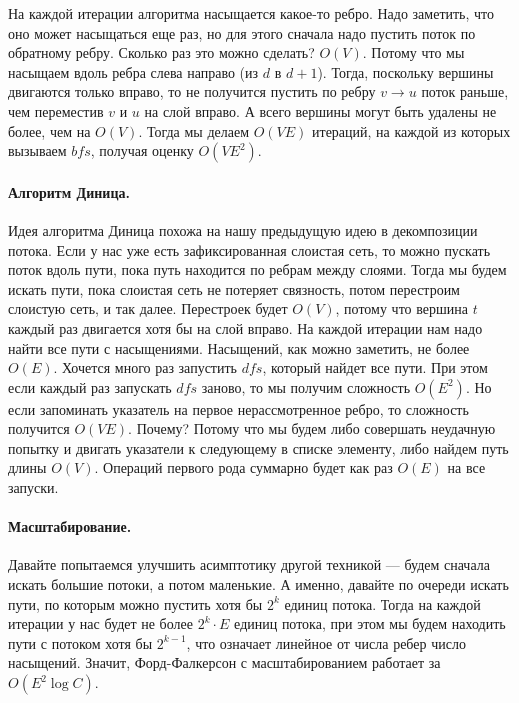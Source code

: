 \documentclass[12pt]{article}
\begin{document}
На каждой итерации алгоритма насыщается какое-то ребро. Надо заметить, что оно может насыщаться еще раз, но для этого сначала надо пустить поток по обратному ребру. Сколько раз это можно сделать? $O(V)$. Потому что мы насыщаем вдоль ребра слева направо (из $d$ в $d + 1$). Тогда, поскольку вершины двигаются только вправо, то не получится пустить по ребру $v \rightarrow u$ поток раньше, чем переместив $v$ и $u$ на слой вправо. А всего вершины могут быть удалены не более, чем на $O(V)$. Тогда мы делаем $O(VE)$ итераций, на каждой из которых вызываем $bfs$, получая оценку $O(VE^2)$.

\paragraph{Алгоритм Диница.} Идея алгоритма Диница похожа на нашу предыдущую идею в декомпозиции потока. Если у нас уже есть зафиксированная слоистая сеть, то можно пускать поток вдоль пути, пока путь находится по ребрам между слоями. Тогда мы будем искать пути, пока слоистая сеть не потеряет связность, потом перестроим слоистую сеть, и так далее. Перестроек будет $O(V)$, потому что вершина $t$ каждый раз двигается хотя бы на слой вправо. На каждой итерации нам надо найти все пути с насыщениями. Насыщений, как можно заметить, не более $O(E)$. Хочется много раз запустить $dfs$, который найдет все пути. При этом если каждый раз запускать $dfs$ заново, то мы получим сложность $O(E^2)$. Но если запоминать указатель на первое нерассмотренное ребро, то сложность получится $O(VE)$. Почему? Потому что мы будем либо совершать неудачную попытку и двигать указатели к следующему в списке элементу, либо найдем путь длины $O(V)$. Операций первого рода суммарно будет как раз $O(E)$ на все запуски.

\paragraph{Масштабирование.} Давайте попытаемся улучшить асимптотику другой техникой --- будем сначала искать большие потоки, а потом маленькие. А именно, давайте по очереди искать пути, по которым можно пустить хотя бы $2^k$ единиц потока. Тогда на каждой итерации у нас будет не более $2^k \cdot E$ единиц потока, при этом мы будем находить пути с потоком хотя бы $2^{k-1}$, что означает линейное от числа ребер число насыщений. Значит, Форд-Фалкерсон с масштабированием работает за $O(E^2 \log C)$.
\end{document}
